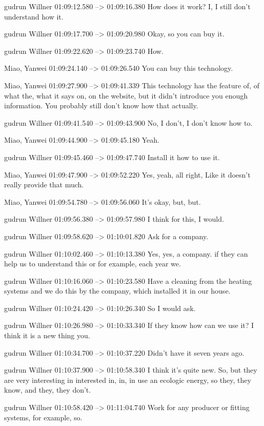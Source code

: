 {gudrun Willner 01:09:12.580 --> 01:09:16.380
How does it work? I, I still don't understand how it.

gudrun Willner 01:09:17.700 --> 01:09:20.980
Okay, so you can buy it.

gudrun Willner 01:09:22.620 --> 01:09:23.740
How.

Miao, Yanwei 01:09:24.140 --> 01:09:26.540
You can buy this technology.

Miao, Yanwei 01:09:27.900 --> 01:09:41.339
This technology has the feature of, of what the, what it says on, on the website, but it didn't introduce you enough information. You probably still don't know how that actually.

gudrun Willner 01:09:41.540 --> 01:09:43.900
No, I don't, I don't know how to.

Miao, Yanwei 01:09:44.900 --> 01:09:45.180
Yeah.

gudrun Willner 01:09:45.460 --> 01:09:47.740
Install it how to use it.

Miao, Yanwei 01:09:47.900 --> 01:09:52.220
Yes, yeah, all right, Like it doesn't really provide that much.

Miao, Yanwei 01:09:54.780 --> 01:09:56.060
It's okay, but, but.

gudrun Willner 01:09:56.380 --> 01:09:57.980
I think for this, I would.

gudrun Willner 01:09:58.620 --> 01:10:01.820
Ask for a company.

gudrun Willner 01:10:02.460 --> 01:10:13.380
Yes, yes, a company. if they can help us to understand this or for example, each year we.

gudrun Willner 01:10:16.060 --> 01:10:23.580
Have a cleaning from the heating systems and we do this by the company, which installed it in our house.

gudrun Willner 01:10:24.420 --> 01:10:26.340
So I would ask.

gudrun Willner 01:10:26.980 --> 01:10:33.340
If they know how can we use it? I think it is a new thing you.

gudrun Willner 01:10:34.700 --> 01:10:37.220
Didn't have it seven years ago.

gudrun Willner 01:10:37.900 --> 01:10:58.340
I think it's quite new. So, but they are very interesting in interested in, in, in use an ecologic energy, so they, they know, and they, they don't.

gudrun Willner 01:10:58.420 --> 01:11:04.740
Work for any producer or fitting systems, for example, so.

}

